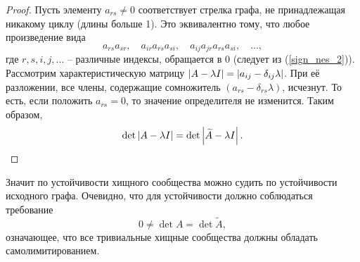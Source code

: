     \begin{proof}
        Пусть элементу \(a_{rs} \neq 0\) соответствует стрелка графа, не принадлежащая никакому циклу (длины больше 1). Это эквивалентно тому, что любое произведение вида
        \begin{equation*}
            a_{rs} a_{sr}, \quad a_{ir} a_{rs} a_{si}, \quad a_{ij} a_{jr} a_{rs} a_{si}, \quad \dots,
        \end{equation*}
        где \(r,s,i,j,\dots\) -- различные индексы, обращается в 0 (следует из (\ref{sign_nes_2})).
        Рассмотрим характеристическую матрицу \(\left\vert  A - \lambda I  \right\vert = \left\vert  a_{ij} - \delta_{ij} \lambda  \right\vert \). При её разложении, все члены, содержащие сомножитель \((a_{rs} - \delta_{rs} \lambda)\), исчезнут. То есть, если положить \(a_{rs} = 0\), то значение определителя не изменится. Таким образом,
        \begin{equation*}
            \det \left\vert  A - \lambda I  \right\vert = \det \left\vert  \widetilde{A} - \lambda I  \right\vert.
        \end{equation*}
    \end{proof}

    Значит по устойчивости хищного сообщества можно судить по устойчивости исходного графа. Очевидно, что для устойчивости должно соблюдаться требование 
    \begin{equation*}
        0 \neq \det A = \det \widetilde{A},
    \end{equation*}
    означающее, что все тривиальные хищные сообщества должны обладать самолимитированием.
    
